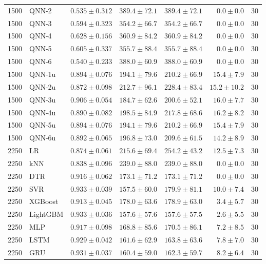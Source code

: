 \begin{longtable}{rlrrrrr}
1500 & QNN-2 & $0.535 \pm 0.312$ & $389.4 \pm 72.1$ & $389.4 \pm 72.1$ & $0.0 \pm 0.0$ & 30 \\
1500 & QNN-3 & $0.594 \pm 0.323$ & $354.2 \pm 66.7$ & $354.2 \pm 66.7$ & $0.0 \pm 0.0$ & 30 \\
1500 & QNN-4 & $0.628 \pm 0.156$ & $360.9 \pm 84.2$ & $360.9 \pm 84.2$ & $0.0 \pm 0.0$ & 30 \\
1500 & QNN-5 & $0.605 \pm 0.337$ & $355.7 \pm 88.4$ & $355.7 \pm 88.4$ & $0.0 \pm 0.0$ & 30 \\
1500 & QNN-6 & $0.540 \pm 0.233$ & $388.0 \pm 60.9$ & $388.0 \pm 60.9$ & $0.0 \pm 0.0$ & 30 \\
1500 & QNN-1u & $0.894 \pm 0.076$ & $194.1 \pm 79.6$ & $210.2 \pm 66.9$ & $15.4 \pm 7.9$ & 30 \\
1500 & QNN-2u & $0.872 \pm 0.098$ & $212.7 \pm 96.1$ & $228.4 \pm 83.4$ & $15.2 \pm 10.2$ & 30 \\
1500 & QNN-3u & $0.906 \pm 0.054$ & $184.7 \pm 62.6$ & $200.6 \pm 52.1$ & $16.0 \pm 7.7$ & 30 \\
1500 & QNN-4u & $0.890 \pm 0.082$ & $198.5 \pm 84.9$ & $217.8 \pm 68.6$ & $16.2 \pm 8.2$ & 30 \\
1500 & QNN-5u & $0.894 \pm 0.076$ & $194.1 \pm 79.6$ & $210.2 \pm 66.9$ & $15.4 \pm 7.9$ & 30 \\
1500 & QNN-6u & $0.892 \pm 0.065$ & $196.8 \pm 73.0$ & $209.6 \pm 61.5$ & $14.2 \pm 8.9$ & 30 \\
\midrule
2250 & LR & $0.874 \pm 0.061$ & $215.6 \pm 69.4$ & $254.2 \pm 43.2$ & $12.5 \pm 7.3$ & 30 \\
2250 & kNN & $0.838 \pm 0.096$ & $239.0 \pm 88.0$ & $239.0 \pm 88.0$ & $0.0 \pm 0.0$ & 30 \\
2250 & DTR & $0.916 \pm 0.062$ & $173.1 \pm 71.2$ & $173.1 \pm 71.2$ & $0.0 \pm 0.0$ & 30 \\
2250 & SVR & $0.933 \pm 0.039$ & $157.5 \pm 60.0$ & $179.9 \pm 81.1$ & $10.0 \pm 7.4$ & 30 \\
2250 & XGBoost & $0.913 \pm 0.045$ & $178.0 \pm 63.6$ & $178.9 \pm 63.0$ & $3.4 \pm 5.7$ & 30 \\
2250 & LightGBM & $0.933 \pm 0.036$ & $157.6 \pm 57.6$ & $157.6 \pm 57.5$ & $2.6 \pm 5.5$ & 30 \\
2250 & MLP & $0.917 \pm 0.098$ & $168.8 \pm 85.6$ & $170.5 \pm 86.1$ & $7.2 \pm 8.5$ & 30 \\
2250 & LSTM & $0.929 \pm 0.042$ & $161.6 \pm 62.9$ & $163.8 \pm 63.6$ & $7.8 \pm 7.0$ & 30 \\
2250 & GRU & $0.931 \pm 0.037$ & $160.4 \pm 59.0$ & $162.3 \pm 59.7$ & $8.2 \pm 6.4$ & 30 \\

\end{longtable}
